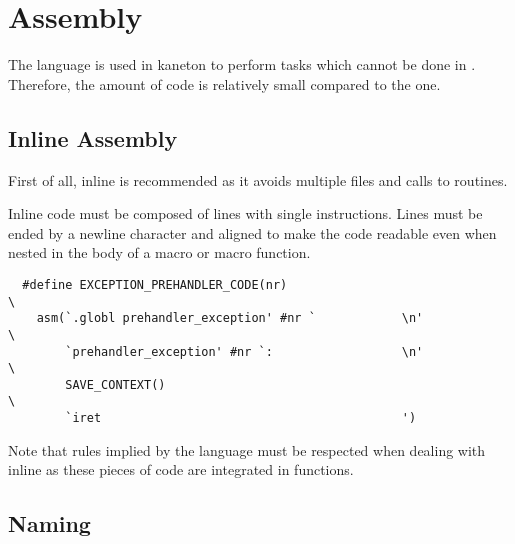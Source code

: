 %
%
%
%
%
%

%
%

\section{Assembly}
\label{section:assembly}

The  language is used in kaneton to perform tasks which
cannot be done in . Therefore, the amount of 
code is relatively small compared to the  one.

%
%

\subsection{Inline Assembly}

First of all, inline  is recommended as it avoids multiple
files and calls to  routines.

Inline  code must be composed of lines with single
instructions. Lines must be ended by a newline character 
and aligned to make the code readable even when nested in the body of a macro
or macro function.

\begin{verbatim}
  #define EXCEPTION_PREHANDLER_CODE(nr)                                 \
    asm(`.globl prehandler_exception' #nr `            \n'              \
        `prehandler_exception' #nr `:                  \n'              \
        SAVE_CONTEXT()                                                  \
        `iret                                          ')
\end{verbatim}

Note that rules implied by the  language must be respected when
dealing with inline \name{Assembly} as these pieces of code are integrated
in \name{C} functions.

%
%

\subsection{Naming}

